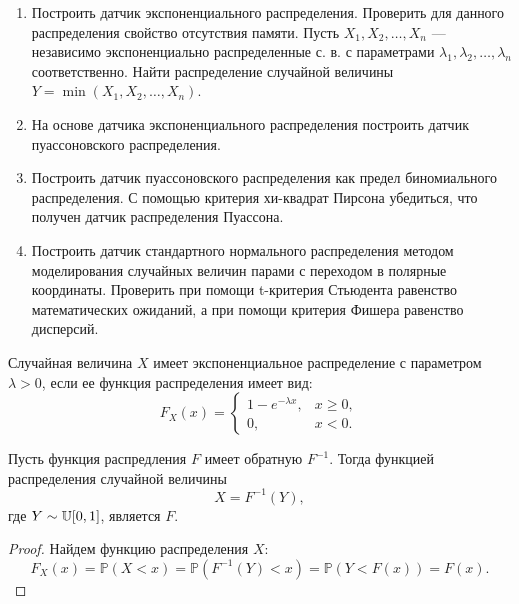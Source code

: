 \begin{enumerate}
	\item Построить датчик экспоненциального распределения. Проверить для
     данного распределения свойство отсутствия памяти. Пусть $X_1, X_2,
     \dots, X_n$ --- независимо экспоненциально распределенные с. в. с
     параметрами $\lambda_1, \lambda_2, \dots, \lambda_n$ соответственно.
     Найти распределение случайной величины $Y = \min(X_1, X_2, \dots, X_n)$.
	\item На основе датчика экспоненциального распределения построить датчик
     пуассоновского распределения.
	\item Построить датчик пуассоновского распределения как предел
     биномиального распределения. С помощью критерия хи-квадрат Пирсона
     убедиться, что получен датчик распределения Пуассона.
	\item Построить датчик стандартного нормального распределения методом
     моделирования случайных величин парами с переходом в полярные координаты.
     Проверить при помощи t-критерия Стьюдента равенство математических
     ожиданий, а при помощи критерия Фишера равенство дисперсий.  
\end{enumerate}

\begin{definition}
	Случайная величина $X$ имеет экспоненциальное распределение с параметром
     $\lambda > 0$, если ее функция распределения имеет вид:
	\begin{equation}\label{exp_func}
	    F_X(x) = 
        \begin{cases}
	        1 - e^{-\lambda x}, &x \geqslant 0,\\
	        0, &x < 0.
	    \end{cases}
	\end{equation}
\end{definition}

\begin{theorem}\label{theor_inverse}
    Пусть функция распредления $ F $ имеет обратную $ F^{-1} $. Тогда
     функцией распределения случайной величины
    $$
     X = F^{-1}(Y),
    $$
     где $ Y \sim \operatorname{\mathbb{U}}[0,1]$, является $ F $.
\end{theorem}
\begin{proof}
    Найдем функцию распределения $ X $:
    $$
     F_X(x) = \mathbb{P}(X < x) = \mathbb{P}(F^{-1}(Y) < x) =
      \mathbb{P}(Y < F(x)) = F(x).
    $$
\end{proof}

